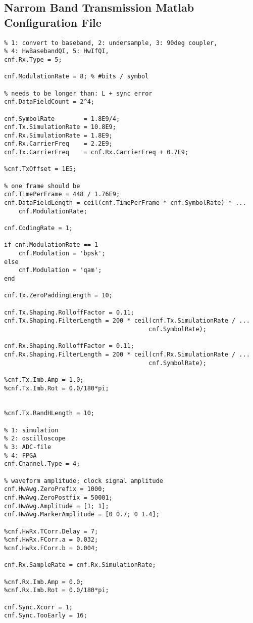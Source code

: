 \begin{appendix}
\chapter{Narrom Band Transmission Matlab Configuration File}
\label{app:res_450_cnf}
\begin{verbatim}
% 1: convert to baseband, 2: undersample, 3: 90deg coupler,
% 4: HwBasebandQI, 5: HwIfQI,
cnf.Rx.Type = 5;

cnf.ModulationRate = 8; % #bits / symbol

% needs to be longer than: L + sync error
cnf.DataFieldCount = 2^4;

cnf.SymbolRate        = 1.8E9/4;
cnf.Tx.SimulationRate = 10.8E9;
cnf.Rx.SimulationRate = 1.8E9;
cnf.Rx.CarrierFreq    = 2.2E9;
cnf.Tx.CarrierFreq    = cnf.Rx.CarrierFreq + 0.7E9;

%cnf.TxOffset = 1E5;

% one frame should be
cnf.TimePerFrame = 448 / 1.76E9;
cnf.DataFieldLength = ceil(cnf.TimePerFrame * cnf.SymbolRate) * ...
    cnf.ModulationRate;

cnf.CodingRate = 1;

if cnf.ModulationRate == 1
    cnf.Modulation = 'bpsk';
else
    cnf.Modulation = 'qam';
end

cnf.Tx.ZeroPaddingLength = 10;

cnf.Tx.Shaping.RolloffFactor = 0.11;
cnf.Tx.Shaping.FilterLength = 200 * ceil(cnf.Tx.SimulationRate / ...
                                        cnf.SymbolRate);

cnf.Rx.Shaping.RolloffFactor = 0.11;
cnf.Rx.Shaping.FilterLength = 200 * ceil(cnf.Rx.SimulationRate / ...
                                        cnf.SymbolRate);

%cnf.Tx.Imb.Amp = 1.0;
%cnf.Tx.Imb.Rot = 0.0/180*pi;


%cnf.Tx.RandHLength = 10;

% 1: simulation
% 2: oscilloscope
% 3: ADC-file
% 4: FPGA
cnf.Channel.Type = 4;

% waveform amplitude; clock signal amplitude
cnf.HwAwg.ZeroPrefix = 1000;
cnf.HwAwg.ZeroPostfix = 50001;
cnf.HwAwg.Amplitude = [1; 1];
cnf.HwAwg.MarkerAmplitude = [0 0.7; 0 1.4];

%cnf.HwRx.TCorr.Delay = 7;
%cnf.HwRx.FCorr.a = 0.032;
%cnf.HwRx.FCorr.b = 0.004;

cnf.Rx.SampleRate = cnf.Rx.SimulationRate;

%cnf.Rx.Imb.Amp = 0.0;
%cnf.Rx.Imb.Rot = 0.0/180*pi;

cnf.Sync.Xcorr = 1;
cnf.Sync.TooEarly = 16;


\end{verbatim}
\end{appendix}

